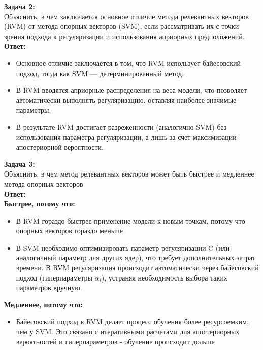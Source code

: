 \textbf{Задача 2:}\\
Объяснить, в чем заключается основное отличие метода релевантных векторов (RVM) от метода опорных векторов (SVM), если рассматривать их с точки зрения подхода к регуляризации и использования априорных предположений. \\
\textbf{Ответ:}
\begin{itemize}
    \item Основное отличие заключается в том, что RVM использует байесовский подход, тогда как SVM — детерминированный метод.
    \item В RVM вводятся априорные распределения на веса модели, что позволяет автоматически выполнять регуляризацию, оставляя наиболее значимые параметры.
    \item В результате RVM достигает разреженности (аналогично SVM) без использования параметра регуляризации, а лишь за счет максимизации апостериорной вероятности.

\end{itemize}


\textbf{Задача 3:}\\
Объяснить, в чем метод релевантных векторов может быть быстрее и медленнее метода опорных векторов \\
\textbf{Ответ:} \\
\textbf{Быстрее, потому что:}
\begin{itemize}
    \item В RVM гораздо быстрее применение модели к новым точкам, потому что опорных векторов гораздо меньше
    \item В SVM необходимо оптимизировать параметр регуляризации C (или аналогичный параметр для других ядер), что требует дополнительных затрат времени. В RVM регуляризация происходит автоматически через байесовский подход (гиперпараметры $\alpha_i$), устраняя необходимость выбора таких параметров вручную.

\end{itemize}
\textbf{Медленнее, потому что:}
\begin{itemize}
    \item Байесовский подход в RVM делает процесс обучения более ресурсоемким, чем у SVM. Это связано с итеративными расчетами для апостериорных вероятностей и гиперпараметров - обучение происходит дольше
\end{itemize}

